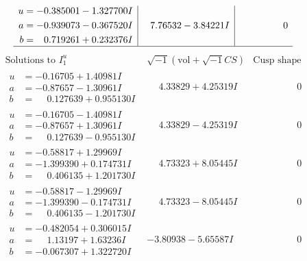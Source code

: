 \documentclass[1p]{elsarticle_modified}
\theoremstyle{definition}
\newcommand{\I}{\sqrt{-1}}
\begin{document}
$$\begin{array}{c|c|c}
\begin{aligned}
u &= -0.385001 - 1.327700 I \\
a &= -0.939073 - 0.367520 I \\
b &= \phantom{-}0.719261 + 0.232376 I\end{aligned}
 & \phantom{-}7.76532 - 3.84221 I & \phantom{-0.000000 } 0\\
 \hline 
 \end{array}$$\newpage$$\begin{array}{c|c|c}  
\text{Solutions to }I^u_{1}& \I (\text{vol} + \sqrt{-1}CS) & \text{Cusp shape}\\
 \hline 
\begin{aligned}
u &= -0.16705 + 1.40981 I \\
a &= -0.87657 - 1.30961 I \\
b &= \phantom{-}0.127639 + 0.955130 I\end{aligned}
 & \phantom{-}4.33829 + 4.25319 I & \phantom{-0.000000 } 0 \\ \hline\begin{aligned}
u &= -0.16705 - 1.40981 I \\
a &= -0.87657 + 1.30961 I \\
b &= \phantom{-}0.127639 - 0.955130 I\end{aligned}
 & \phantom{-}4.33829 - 4.25319 I & \phantom{-0.000000 } 0 \\ \hline\begin{aligned}
u &= -0.58817 + 1.29969 I \\
a &= -1.399390 + 0.174731 I \\
b &= \phantom{-}0.406135 + 1.201730 I\end{aligned}
 & \phantom{-}4.73323 + 8.05445 I & \phantom{-0.000000 } 0 \\ \hline\begin{aligned}
u &= -0.58817 - 1.29969 I \\
a &= -1.399390 - 0.174731 I \\
b &= \phantom{-}0.406135 - 1.201730 I\end{aligned}
 & \phantom{-}4.73323 - 8.05445 I & \phantom{-0.000000 } 0 \\ \hline\begin{aligned}
u &= -0.482054 + 0.306015 I \\
a &= \phantom{-}1.13197 + 1.63236 I \\
b &= -0.067307 + 1.322720 I\end{aligned}
 & -3.80938 - 5.65587 I & \phantom{-0.000000 } 0 \\ \hline\begin{aligned}

\end{aligned}
\end{array}$$
\end{document}
